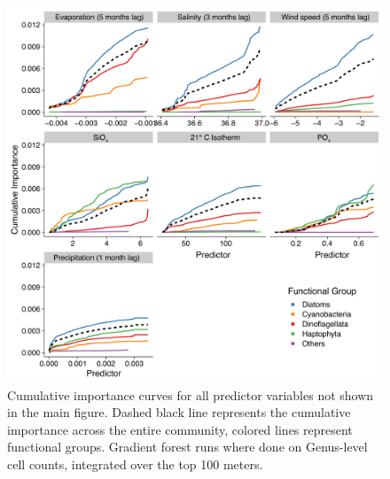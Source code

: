 \documentclass[draft]{agujournal2019}
\begin{document}
\begin{figure}[h!]
\noindent\includegraphics[width=\textwidth]{fig/FigureA2_GF_output_Supplement_v1.pdf}
\caption{Cumulative importance curves for all predictor variables not shown in the main figure. Dashed black line represents the cumulative importance across the entire community, colored lines represent functional groups. Gradient forest runs where done on Genus-level cell counts, integrated over the top 100 meters.}
\label{fig:sup:GFoutput_lags_extra}
\end{figure}
\end{document}
